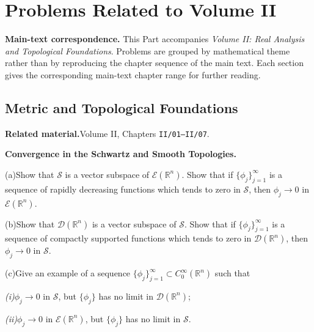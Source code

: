 \chapter{Problems Related to Volume II}
\label{ch:companion-ii}

\par\medskip\noindent\textbf{Main-text correspondence.}\quad
This Part accompanies \emph{Volume II: Real Analysis and Topological Foundations}. Problems are grouped by
mathematical theme rather than by reproducing the chapter sequence of the main text.
Each section gives the corresponding main-text chapter range for further reading.

\section{Metric and Topological Foundations}

\par\medskip\noindent\textbf{Related material.}\quad  Volume II, Chapters \texttt{II/01--II/07}.

\begin{problem}[CP-II-0006]
\label{prob:cp-ii-0006}
\textbf{Convergence in the Schwartz and Smooth Topologies.}

\par\hspace*{1.5em} (a)\quad Show that $\mathcal{S}$ is a vector subspace of
	$\mathcal{E}(\mathbb{R}^n)$.  Show that if
	$\{\phi_j\}_{j=1}^\infty$ is a sequence of rapidly
	decreasing functions which tends to zero in $\mathcal{S}$,
	then $\phi_j \to 0$ in $\mathcal{E}(\mathbb{R}^n)$.

	\par\noindent (b)\quad Show that $\mathcal{D}(\mathbb{R}^n)$ is a vector subspace
	of $\mathcal{S}$.  Show that if $\{\phi_j\}_{j=1}^\infty$
	is a sequence of compactly supported functions which tends
	to zero in $\mathcal{D}(\mathbb{R}^n)$, then
	$\phi_j \to 0$ in $\mathcal{S}$.

	\par\noindent (c)\quad Give an example of a sequence
	$\{\phi_j\}_{j=1}^\infty \subset C_0^\infty(\mathbb{R}^n)$
	such that

\par\smallskip\noindent\textit{(i)}\quad $\phi_j \to 0$ in $\mathcal{S}$, but
		$\{\phi_j\}$ has no limit in
		$\mathcal{D}(\mathbb{R}^n)$;
\par\smallskip\noindent\textit{(ii)}\quad $\phi_j \to 0$ in $\mathcal{E}(\mathbb{R}^n)$,
		but $\{\phi_j\}$ has no limit in $\mathcal{S}$.
\end{problem}

